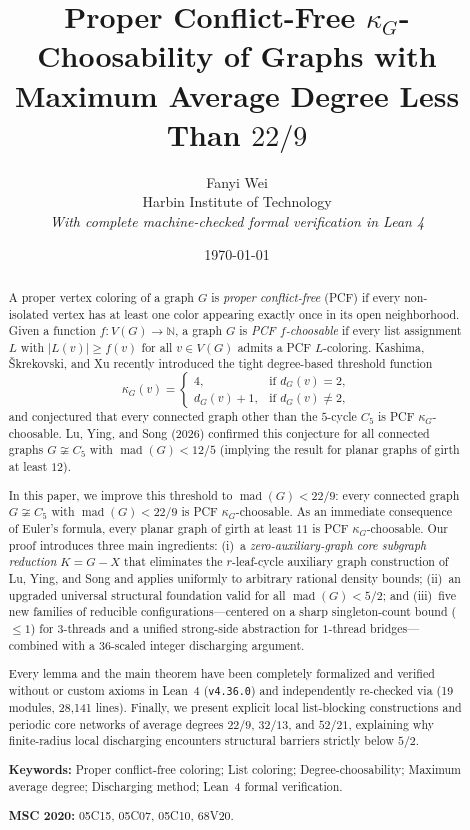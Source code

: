 \documentclass[11pt,a4paper]{article}
\title{Proper Conflict-Free $\kappa_G$-Choosability of Graphs with\\Maximum Average Degree Less Than $22/9$}
\author{
  Fanyi Wei\\[3pt]
  \small Harbin Institute of Technology\\[4pt]
  \small\textit{With complete machine-checked formal verification in Lean 4}
}
\date{\today}
\theoremstyle{definition}
\newcommand{\mad}{\operatorname{mad}}
\newcommand{\N}{\mathbb{N}}
\newcommand{\code}[1]{\texttt{\detokenize{#1}}}
\begin{document}
\maketitle

\begin{abstract}
A proper vertex coloring of a graph $G$ is \emph{proper conflict-free} (PCF) if every non-isolated vertex has at least one color appearing exactly once in its open neighborhood. Given a function $f : V(G) \to \N$, a graph $G$ is \emph{PCF $f$-choosable} if every list assignment $L$ with $|L(v)| \ge f(v)$ for all $v \in V(G)$ admits a PCF $L$-coloring. Kashima, \v{S}krekovski, and Xu recently introduced the tight degree-based threshold function
\[
  \kappa_G(v) = \begin{cases} 4, & \text{if } d_G(v) = 2,\\ d_G(v) + 1, & \text{if } d_G(v) \neq 2, \end{cases}
\]
and conjectured that every connected graph other than the $5$-cycle $C_5$ is PCF $\kappa_G$-choosable. Lu, Ying, and Song (2026) confirmed this conjecture for all connected graphs $G \not\cong C_5$ with $\mad(G) < 12/5$ (implying the result for planar graphs of girth at least $12$).

In this paper, we improve this threshold to $\mad(G) < 22/9$: every connected graph $G \not\cong C_5$ with $\mad(G) < 22/9$ is PCF $\kappa_G$-choosable. As an immediate consequence of Euler's formula, every planar graph of girth at least $11$ is PCF $\kappa_G$-choosable. Our proof introduces three main ingredients: (i)~a \emph{zero-auxiliary-graph core subgraph reduction} $K = G - X$ that eliminates the $r$-leaf-cycle auxiliary graph construction of Lu, Ying, and Song and applies uniformly to arbitrary rational density bounds; (ii)~an upgraded universal structural foundation valid for all $\mad(G) < 5/2$; and (iii)~five new families of reducible configurations---centered on a sharp singleton-count bound ($\le 1$) for $3$-threads and a unified strong-side abstraction for $1$-thread bridges---combined with a $36$-scaled integer discharging argument.

Every lemma and the main theorem have been completely formalized and verified without \code{sorry} or custom axioms in Lean~4 (\texttt{v4.36.0}) and independently re-checked via \code{leanchecker} (19 modules, 28{,}141 lines). Finally, we present explicit local list-blocking constructions and periodic core networks of average degrees $22/9$, $32/13$, and $52/21$, explaining why finite-radius local discharging encounters structural barriers strictly below $5/2$.

\medskip
\noindent\textbf{Keywords:} Proper conflict-free coloring; List coloring; Degree-choosability; Maximum average degree; Discharging method; Lean~4 formal verification.

\noindent\textbf{MSC 2020:} 05C15, 05C07, 05C10, 68V20.
\end{abstract}
\end{document}
